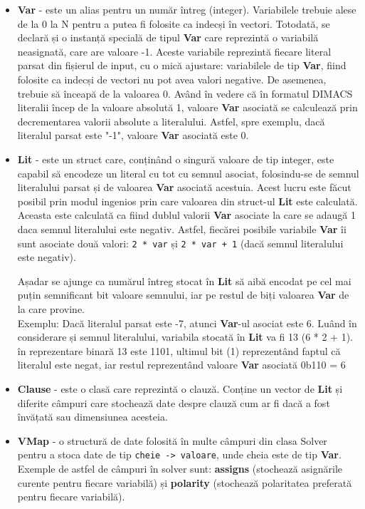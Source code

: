 \documentclass{llncs}
\begin{document}
\begin{itemize}
    \item \textbf{Var} - este un alias pentru un număr întreg (integer). Variabilele trebuie alese de la 0 la N pentru a putea fi folosite ca indecși în vectori. Totodată, se declară și o instanță specială de tipul \textbf{Var} care reprezintă o variabilă neasignată, care are valoare -1. Aceste variabile reprezintă fiecare literal parsat din fișierul de input, cu o mică ajustare: variabilele de tip \textbf{Var}, fiind folosite ca indecși de vectori nu pot avea valori negative. De asemenea, trebuie să înceapă de la valoarea 0. Având în vedere că în formatul DIMACS literalii încep de la valoare absolută 1, valoare \textbf{Var} asociată se calculează prin decrementarea valorii absolute a literalului. Astfel, spre exemplu, dacă literalul parsat este "-1", valoare \textbf{Var} asociată este 0.
    \\
    \item \textbf{Lit} - este un struct care, conținând o singură valoare de tip integer, este capabil să encodeze un literal cu tot cu semnul asociat, folosindu-se de semnul literalului parsat și de valoarea \textbf{Var} asociată acestuia. Acest lucru este făcut posibil prin modul ingenios prin care valoarea din struct-ul \textbf{Lit} este calculată. Aceasta este calculată ca fiind dublul valorii \textbf{Var} asociate la care se adaugă 1 daca semnul literalului este negativ. Astfel, fiecărei posibile variabile \textbf{Var} îi sunt asociate două valori: \texttt{2 * var} și \texttt{2 * var + 1} (dacă semnul literalului este negativ).
    
    Așadar se ajunge ca numărul întreg stocat în \textbf{Lit} să aibă encodat pe cel mai puțin semnificant bit valoare semnului, iar pe restul de biți valoarea \textbf{Var} de la care provine. \\ Exemplu: Dacă literalul parsat este -7, atunci \textbf{Var}-ul asociat este 6. Luând în considerare și semnul literalului, variabila stocată în \textbf{Lit} va fi 13 (6 * 2 + 1). în reprezentare binară 13 este 1101, ultimul bit (1) reprezentând faptul că literalul este negat, iar restul reprezentând valoare \textbf{Var} asociată 0b110 = 6
    \\
    \item \textbf{Clause} - este o clasă care reprezintă o clauză. Conține un vector de \textbf{Lit} și diferite câmpuri care stochează date despre clauză cum ar fi dacă a fost învățată sau dimensiunea acesteia.
    \\
    \item \textbf{VMap} - o structură de date folosită în multe câmpuri din clasa Solver pentru a stoca date de tip \texttt{cheie -> valoare}, unde cheia este de tip \textbf{Var}. Exemple de astfel de câmpuri în solver sunt: \textbf{assigns} (stochează asignările curente pentru fiecare variabilă) și \textbf{polarity} (stochează polaritatea preferată pentru fiecare variabilă).   
\end{itemize}
\end{document}
